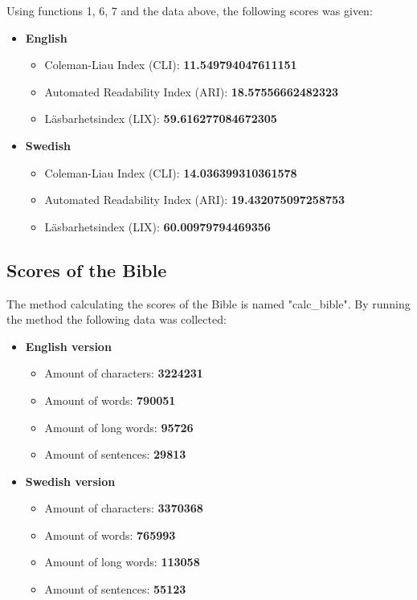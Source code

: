 \documentclass[a4paper]{article}
\begin{document}
Using functions 1, 6, 7 and the data above, the following scores was given:

\begin{itemize}
    \item \textbf{English}
    \begin{itemize}
        \item Coleman-Liau Index (CLI): \textbf{11.549794047611151}
        \item Automated Readability Index (ARI): \textbf{18.57556662482323}
        \item Läsbarhetsindex (LIX): \textbf{59.616277084672305}
    \end{itemize}
    \item \textbf{Swedish}
    \begin{itemize}
        \item Coleman-Liau Index (CLI): \textbf{14.036399310361578}
        \item Automated Readability Index (ARI): \textbf{19.432075097258753}
        \item Läsbarhetsindex (LIX): \textbf{60.00979794469356}
    \end{itemize}
\end{itemize}

\subsection{Scores of the Bible}
The method calculating the scores of the Bible is named "calc\_bible". By running the method the following data was collected:

\begin{itemize}
	\item \textbf{English version}
	\begin{itemize}
		\item Amount of characters: \textbf{3224231}
		\item Amount of words: \textbf{790051}
		\item Amount of long words: \textbf{95726}
		\item Amount of sentences: \textbf{29813}
	\end{itemize}
	\item \textbf{Swedish version}
	\begin{itemize}
		\item Amount of characters: \textbf{3370368}
		\item Amount of words: \textbf{765993}
		\item Amount of long words: \textbf{113058}
		\item Amount of sentences: \textbf{55123}
	\end{itemize}
\end{itemize}
\end{document}
